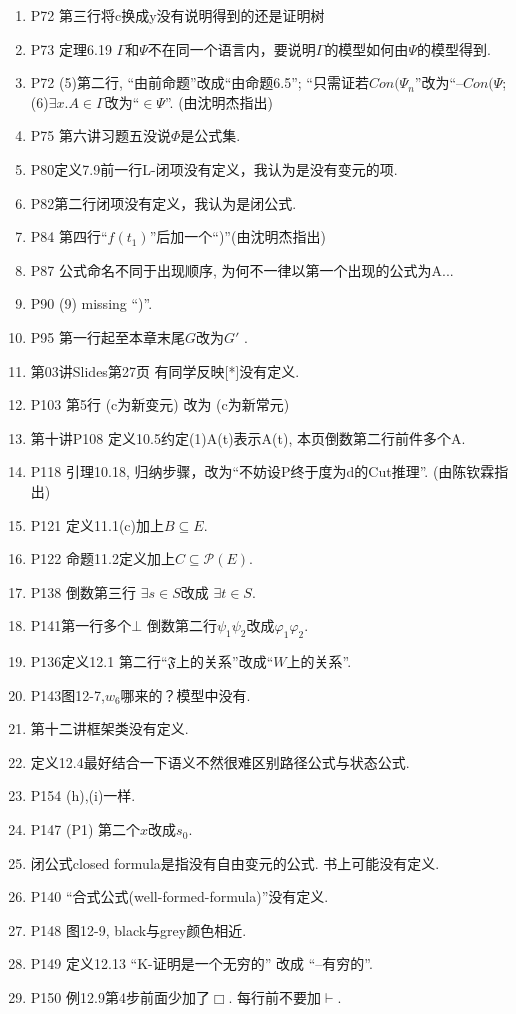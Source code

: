 \documentclass{article}
\begin{document}
\begin{enumerate}
\item P72 第三行将c换成y没有说明得到的还是证明树
\item P73 定理6.19 $\Gamma$和$\Psi$不在同一个语言内，要说明$\Gamma$的模型如何由$\Psi$的模型得到. 
\item P72 (5)第二行, ``由前命题''改成``由命题6.5''; ``只需证若$Con(\Psi_n$''改为``--$Con(\Psi$; (6)$\exists x.A \in \Gamma$改为``$\in \Psi$''. (由沈明杰指出)
\item P75 第六讲习题五没说$\Phi$是公式集. 
\item P80定义7.9前一行L-闭项没有定义，我认为是没有变元的项. 
\item P82第二行闭项没有定义，我认为是闭公式. 
\item P84 第四行``$f(t_1)$''后加一个``)''(由沈明杰指出)
\item P87 公式命名不同于出现顺序, 为何不一律以第一个出现的公式为A...
\item P90 (9) missing ``)''. 
\item P95 第一行起至本章末尾$G$改为$G'$ . 
\item 第03讲Slides第27页 有同学反映[*]没有定义. 
\item P103 第5行 (c为新变元) 改为 (c为新常元)
\item 第十讲P108 定义10.5约定(1)A(t)表示A(t), 本页倒数第二行前件多个A. 
\item P118 引理10.18, 归纳步骤，改为``不妨设P终于度为d的Cut推理''. (由陈钦霖指出)
\item P121 定义11.1(c)加上$B\subseteq E$. 
\item P122 命题11.2定义加上$C\subseteq \mathcal{P}(E)$. 
\item P138 倒数第三行 $\exists s \in S$改成 $\exists t \in S$. 
\item P141第一行多个$\bot$ 倒数第二行$\psi_1 \psi_2$改成$\varphi_1 \varphi_2$. 
\item P136定义12.1 第二行``$\mathfrak{F}$上的关系''改成``$W$上的关系''. 
\item P143图12-7,$w_6$哪来的？模型中没有. 
\item 第十二讲框架类没有定义. 


\item 定义12.4最好结合一下语义不然很难区别路径公式与状态公式. 
\item P154 (h),(i)一样. 
\item P147 (P1) 第二个$x$改成$s_0$. 
\item 闭公式closed formula是指没有自由变元的公式. 书上可能没有定义. 
\item P140 ``合式公式(well-formed-formula)''没有定义. 
\item P148 图12-9, black与grey颜色相近. 
\item P149 定义12.13 ``K-证明是一个无穷的'' 改成 ``--有穷的''. 
\item P150 例12.9第4步前面少加了$\Box$. 每行前不要加$\vdash$. 


\end{enumerate}
\end{document}
